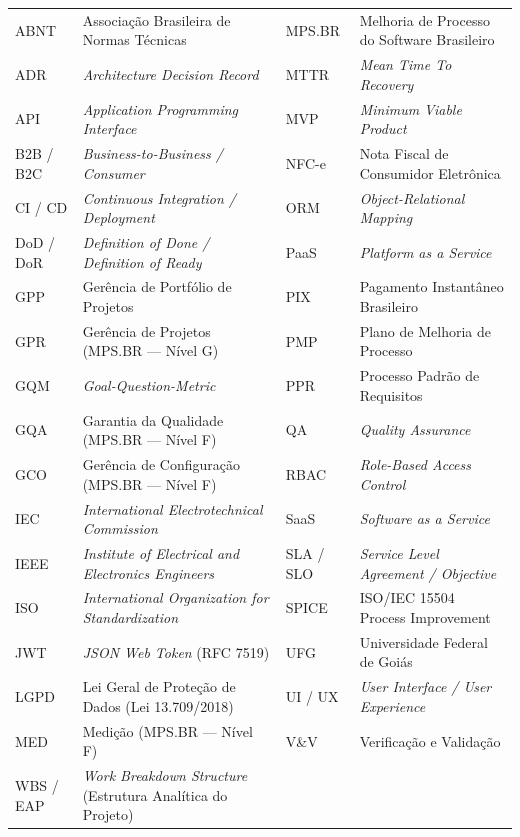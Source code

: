 \begin{tabularx}{\textwidth}{@{}>{\fontExtraBold\color{BrandNavy}\arraybackslash}m{1.8cm} >{\arraybackslash}m{5.2cm} @{\hspace{0.8cm}} >{\fontExtraBold\color{BrandNavy}\arraybackslash}m{1.8cm} Y@{}}
  ABNT & Associação Brasileira de Normas Técnicas & MPS.BR & Melhoria de Processo do Software Brasileiro \\
  ADR & \emph{Architecture Decision Record} & MTTR & \emph{Mean Time To Recovery} \\
  API & \emph{Application Programming Interface} & MVP & \emph{Minimum Viable Product} \\
  B2B / B2C & \emph{Business-to-Business / Consumer} & NFC-e & Nota Fiscal de Consumidor Eletrônica \\
  CI / CD & \emph{Continuous Integration / Deployment} & ORM & \emph{Object-Relational Mapping} \\
  DoD / DoR & \emph{Definition of Done / Definition of Ready} & PaaS & \emph{Platform as a Service} \\
  GPP & Gerência de Portfólio de Projetos & PIX & Pagamento Instantâneo Brasileiro \\
  GPR & Gerência de Projetos (MPS.BR --- Nível G) & PMP & Plano de Melhoria de Processo \\
  GQM & \emph{Goal-Question-Metric} & PPR & Processo Padrão de Requisitos \\
  GQA & Garantia da Qualidade (MPS.BR --- Nível F) & QA & \emph{Quality Assurance} \\
  GCO & Gerência de Configuração (MPS.BR --- Nível F) & RBAC & \emph{Role-Based Access Control} \\
  IEC & \emph{International Electrotechnical Commission} & SaaS & \emph{Software as a Service} \\
  IEEE & \emph{Institute of Electrical and Electronics Engineers} & SLA / SLO & \emph{Service Level Agreement / Objective} \\
  ISO & \emph{International Organization for Standardization} & SPICE & ISO/IEC 15504 Process Improvement \\
  JWT & \emph{JSON Web Token} (RFC 7519) & UFG & Universidade Federal de Goiás \\
  LGPD & Lei Geral de Proteção de Dados (Lei 13.709/2018) & UI / UX & \emph{User Interface / User Experience} \\
  MED & Medição (MPS.BR --- Nível F) & V\&V & Verificação e Validação \\
  WBS / EAP & \emph{Work Breakdown Structure} (Estrutura Analítica do Projeto) &  & \\
\end{tabularx}%
